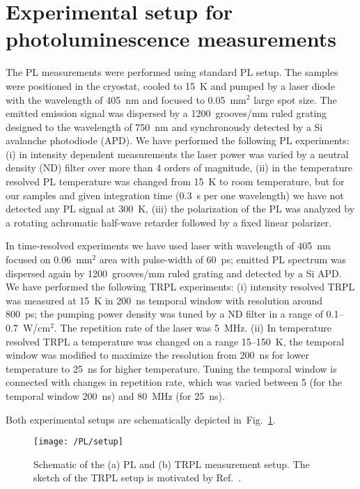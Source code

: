 \clearpage


\section{Experimental setup for photoluminescence measurements}
The PL measurements were performed using standard PL setup. The samples were positioned in the cryostat, cooled to 15~K and pumped by a laser diode with the wavelength of 405~nm and focused to 0.05~mm$^2$ large spot size. The emitted emission signal was dispersed by a 1200~grooves/mm ruled grating designed to the wavelength of 750~nm and synchronously detected by a Si avalanche photodiode (APD). We have performed the following PL experiments: (i) in intensity dependent measurements the laser power was varied by a neutral density (ND) filter over more than 4 orders of magnitude, (ii) in the temperature resolved PL temperature was changed from 15~K to room temperature, but for our samples and given integration time (0.3~s per one wavelength) we have not detected any PL signal at 300~K, (iii) the polarization of the PL was analyzed by a rotating achromatic half-wave retarder followed by a fixed linear polarizer.

In time-resolved experiments we have used laser with wavelength of 405~nm focused on 0.06~mm$^2$ area with pulse-width of 60~ps; emitted PL spectrum was dispersed again by 1200~grooves/mm ruled grating and detected by a Si APD. We have performed the following TRPL experiments: (i) intensity resolved TRPL was measured at 15~K in 200~ns temporal window with resolution around 800~ps; the pumping power density was tuned by a ND filter in a range of 0.1--0.7~W/cm$^2$. The repetition rate of the laser was 5~MHz. (ii) In temperature resolved TRPL a temperature was changed on a range 15--150~K, the temporal window was modified to maximize the resolution from 200~ns for lower temperature to 25~ns for higher temperature. Tuning the temporal window is connected with changes in repetition rate, which was varied between 5 (for the temporal window 200~ns) and 80~MHz (for 25~ns).

Both experimental setups are schematically depicted in~Fig.~\ref{fig:Madrid_setup}.
\begin{figure}
	\centering
	\texttt{[image: /PL/setup]}
	\caption{Schematic of the (a) PL and (b) TRPL measurement setup. The sketch of the TRPL setup is motivated by Ref.~\citep{TRPL_setup}.}
	\label{fig:Madrid_setup}
\end{figure}


